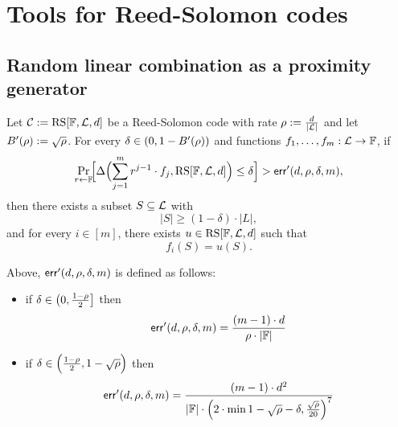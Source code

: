 \chapter{Tools for Reed-Solomon codes}

\section{Random linear combination as a proximity generator}\label{sec:proximity_gap}


\begin{theorem}\label{thm:proximity_gap}
\leanok
{}
    Let $\mathcal{C} := \mathrm{RS}[\mathbb{F},\mathcal{L},d]$ be a Reed-Solomon code with rate $\rho:=\frac{d}{|\mathcal{L}|}$ and let $B'(\rho):=\sqrt{\rho}$. For every $\delta \in (0,1 - B'(\rho))$ and functions $f_1,\ldots,f_m : \mathcal{L} \to \mathbb{F}$, if
    \[
    \Pr_{r\leftarrow\mathbb{F}}\!\Bigl[
      \Delta\Bigl(\sum_{j=1}^m r^{j - 1}\cdot {f_j},\mathrm{RS}[\mathbb{F},\mathcal{L},d]\Bigr)
      \le \delta
    \Bigr]>\mathsf{err}'(d,\rho,\delta,m),
    \]
    then there exists a subset $S \subseteq \mathcal{L}$ with 
    \[
    |S| \ge (1 - \delta)\cdot|L|,
    \]
    and for every $i \in [m]$, there exists $u \in \mathrm{RS}[\mathbb{F},\mathcal{L},d]$ such that
    \[
    f_i(S) = u(S).
    \]
    
    \medskip
    
    \noindent
    Above, $\mathsf{err}'(d,\rho,\delta,m)$ is defined as follows:
    \begin{itemize}
        \item if $\delta \in \left(0,\frac{1-\rho}{2}\right]$ then
            \[
                \mathsf{err}'(d,\rho,\delta,m)=\frac{(m-1)\cdot d}{\rho\cdot|\mathbb{F}|}
            \]
        \item if $\delta \in \Bigl(\frac{1-\rho}{2}, 1-\sqrt{\rho}\Bigr)$ then
        \[
            \mathsf{err}'(d,\rho,\delta,m)=\frac{(m-1)\cdot {d}^2}{|\mathbb{F}|\cdot{\Bigl(2\cdot\min{1-\sqrt{\rho}-\delta,\frac{\sqrt{\rho}}{20}}\Bigr)}^7}
        \]
    \end{itemize}
    \end{theorem}
    
